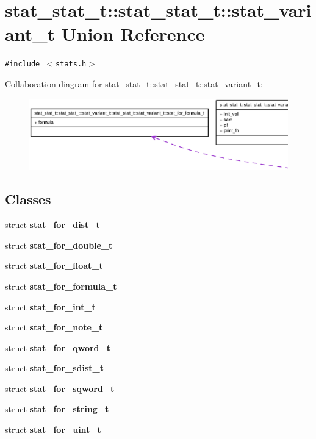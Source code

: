 \section{stat\_\-stat\_\-t::stat\_\-stat\_\-t::stat\_\-variant\_\-t Union Reference}
\label{unionstat__stat__t_1_1stat__variant__t}
{\tt \#include $<$stats.h$>$}

Collaboration diagram for stat\_\-stat\_\-t::stat\_\-stat\_\-t::stat\_\-variant\_\-t:\nopagebreak
\begin{figure}[H]
\begin{center}
\leavevmode
\includegraphics[width=400pt]{unionstat__stat__t_1_1stat__variant__t__coll__graph}
\end{center}
\end{figure}
\subsection*{Classes}
\begin{CompactItemize}
\item 
struct {\bf stat\_\-for\_\-dist\_\-t}
\item 
struct {\bf stat\_\-for\_\-double\_\-t}
\item 
struct {\bf stat\_\-for\_\-float\_\-t}
\item 
struct {\bf stat\_\-for\_\-formula\_\-t}
\item 
struct {\bf stat\_\-for\_\-int\_\-t}
\item 
struct {\bf stat\_\-for\_\-note\_\-t}
\item 
struct {\bf stat\_\-for\_\-qword\_\-t}
\item 
struct {\bf stat\_\-for\_\-sdist\_\-t}
\item 
struct {\bf stat\_\-for\_\-sqword\_\-t}
\item 
struct {\bf stat\_\-for\_\-string\_\-t}
\item 
struct {\bf stat\_\-for\_\-uint\_\-t}
\end{CompactItemize}
